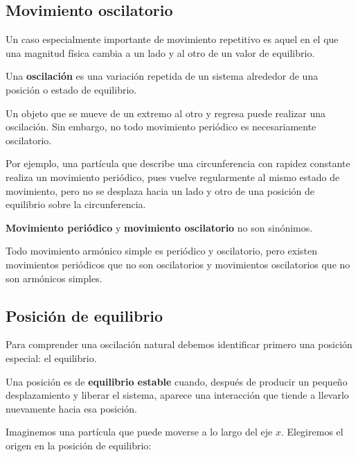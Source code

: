 \subsection{Movimiento oscilatorio}

Un caso especialmente importante de movimiento repetitivo es aquel en el que una magnitud física cambia a un lado y al otro de un valor de equilibrio.

\begin{definicion}[Oscilación]
Una \textbf{oscilación} es una variación repetida de un sistema alrededor de una posición o estado de equilibrio.
\end{definicion}

Un objeto que se mueve de un extremo al otro y regresa puede realizar una oscilación. Sin embargo, no todo movimiento periódico es necesariamente oscilatorio.

Por ejemplo, una partícula que describe una circunferencia con rapidez constante realiza un movimiento periódico, pues vuelve regularmente al mismo estado de movimiento, pero no se desplaza hacia un lado y otro de una posición de equilibrio sobre la circunferencia.

\begin{advertencia}
\textbf{Movimiento periódico} y \textbf{movimiento oscilatorio} no son sinónimos.

Todo movimiento armónico simple es periódico y oscilatorio, pero existen movimientos periódicos que no son oscilatorios y movimientos oscilatorios que no son armónicos simples.
\end{advertencia}

\subsection{Posición de equilibrio}

Para comprender una oscilación natural debemos identificar primero una posición especial: el equilibrio.

\begin{definicion}
Una posición es de \textbf{equilibrio estable} cuando, después de producir un pequeño desplazamiento y liberar el sistema, aparece una interacción que tiende a llevarlo nuevamente hacia esa posición.
\end{definicion}

Imaginemos una partícula que puede moverse a lo largo del eje \(x\). Elegiremos el origen en la posición de equilibrio:


